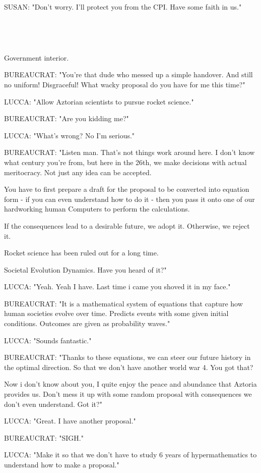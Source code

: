 \documentclass[11pt]{article}
\begin{document}
SUSAN: "Don't worry. I'll protect you from the CPI.
Have some faith in us."

\ 

\ 

Government interior.

BUREAUCRAT: "You're that dude who messed up a simple handover.
And still no uniform! 
Disgraceful!
What wacky proposal do you have for me this time?"

LUCCA: "Allow Aztorian scientists to pursue rocket science."

BUREAUCRAT: "Are you kidding me?"

LUCCA: "What's wrong? No I'm serious."

BUREAUCRAT: "Listen man.
That's not things work around here.
I don't know what century you're from, but here in the 26th, we make decisions with actual meritocracy.
Not just any idea can be accepted.

You have to first prepare a draft for the proposal to be converted into equation form - if you can even understand how to do it - then you pass it onto one of our hardworking human Computers to perform the calculations.

If the consequences lead to a desirable future, we adopt it.
Otherwise, we reject it.

Rocket science has been ruled out for a long time. 

Societal Evolution Dynamics. 
Have you heard of it?"

LUCCA: "Yeah. Yeah I have.
Last time i came you shoved it in my face."

BUREAUCRAT: "It is a mathematical system of equations that capture how human societies evolve over time.
Predicts events with some given initial conditions.
Outcomes are given as probability waves."

LUCCA: "Sounds fantastic."

BUREAUCRAT: "Thanks to these equations, we can steer our future history in the optimal direction.
So that we don't have another world war 4. 
You got that?

Now i don't know about you, I quite enjoy the peace and abundance that Aztoria provides us.
Don't mess it up with some random proposal with consequences we don't even understand.
Got it?"

LUCCA: "Great. 
I have another proposal."

BUREAUCRAT: "SIGH."

LUCCA: "Make it so that we don't have to study 6 years of hypermathematics to understand how to make a proposal."
\end{document}
